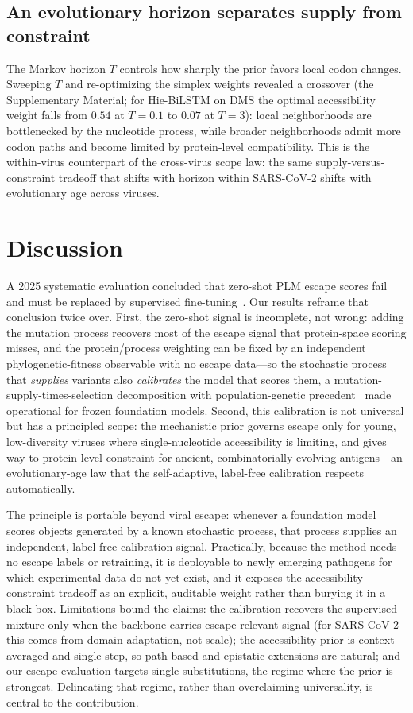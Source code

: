 \documentclass[11pt]{article}
\begin{document}
\subsection*{An evolutionary horizon separates supply from constraint}
The Markov horizon $T$ controls how sharply the prior favors local codon changes. Sweeping $T$ and re-optimizing the simplex weights revealed a crossover (the Supplementary Material; for Hie-BiLSTM on DMS the optimal accessibility weight falls from $0.54$ at $T=0.1$ to $0.07$ at $T=3$): local neighborhoods are bottlenecked by the nucleotide process, while broader neighborhoods admit more codon paths and become limited by protein-level compatibility. This is the within-virus counterpart of the cross-virus scope law: the same supply-versus-constraint tradeoff that shifts with horizon within SARS-CoV-2 shifts with evolutionary age across viruses.

\section*{Discussion}

A 2025 systematic evaluation concluded that zero-shot PLM escape scores fail and must be replaced by supervised fine-tuning~\cite{allman2025systematic}. Our results reframe that conclusion twice over. First, the zero-shot signal is incomplete, not wrong: adding the mutation process recovers most of the escape signal that protein-space scoring misses, and the protein/process weighting can be fixed by an independent phylogenetic-fitness observable with no escape data---so the stochastic process that \emph{supplies} variants also \emph{calibrates} the model that scores them, a mutation-supply-times-selection decomposition with population-genetic precedent~\cite{Rodrigue2010} made operational for frozen foundation models. Second, this calibration is not universal but has a principled scope: the mechanistic prior governs escape only for young, low-diversity viruses where single-nucleotide accessibility is limiting, and gives way to protein-level constraint for ancient, combinatorially evolving antigens---an evolutionary-age law that the self-adaptive, label-free calibration respects automatically.

The principle is portable beyond viral escape: whenever a foundation model scores objects generated by a known stochastic process, that process supplies an independent, label-free calibration signal. Practically, because the method needs no escape labels or retraining, it is deployable to newly emerging pathogens for which experimental data do not yet exist, and it exposes the accessibility--constraint tradeoff as an explicit, auditable weight rather than burying it in a black box. Limitations bound the claims: the calibration recovers the supervised mixture only when the backbone carries escape-relevant signal (for SARS-CoV-2 this comes from domain adaptation, not scale); the accessibility prior is context-averaged and single-step, so path-based and epistatic extensions are natural; and our escape evaluation targets single substitutions, the regime where the prior is strongest. Delineating that regime, rather than overclaiming universality, is central to the contribution.
\end{document}
